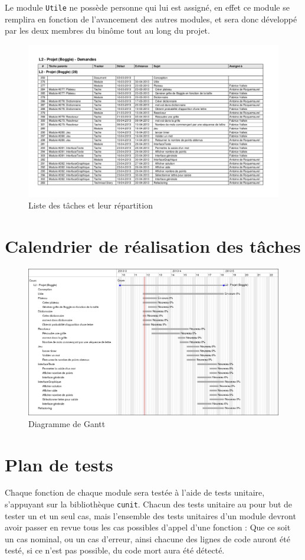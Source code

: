 \documentclass[12pt,a4paper,openany]{article}
\begin{document}
	Le module \texttt{Utile} ne possède personne qui lui est assigné, en effet ce module se remplira en fonction de l'avancement des autres modules, et sera donc
	développé par les deux membres du binôme tout au long du projet.
	\begin{figure}[H]
		\centering
		\includegraphics[angle=-90,width=15.2cm]{taches.pdf}
		\caption{Liste des tâches et leur répartition}
	\end{figure}
	\section{Calendrier de réalisation des tâches}
	\begin{figure}[H]
		\centering
		\includegraphics[angle=-90,width=14.2cm]{gantt.png}
		\caption{Diagramme de Gantt}
	\end{figure}
	\section{Plan de tests}
	Chaque fonction de chaque module sera testée à l'aide de tests unitaire, s'appuyant sur la bibliothèque \texttt{cunit}. Chacun des tests unitaire au pour but
	de tester un et un seul cas, mais l'ensemble des tests unitaires d'un module devront avoir passer en revue tous les cas possibles d'appel d'une fonction :
	Que ce soit un cas nominal, ou un cas d'erreur, ainsi chacune des lignes de code auront été testé, si ce n'est pas possible, du code mort aura été détecté. 
\end{document}
